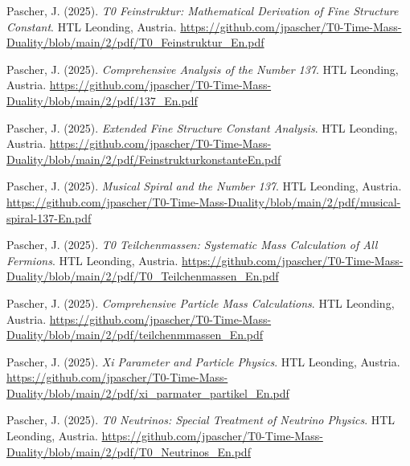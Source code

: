 \documentclass{article}
\begin{document}
\begin{thebibliography}{99}
		
		Pascher, J. (2025).
		\textit{T0 Feinstruktur: Mathematical Derivation of Fine Structure Constant}.
		HTL Leonding, Austria.
		\url{https://github.com/jpascher/T0-Time-Mass-Duality/blob/main/2/pdf/T0_Feinstruktur_En.pdf}
		
		Pascher, J. (2025).
		\textit{Comprehensive Analysis of the Number 137}.
		HTL Leonding, Austria.
		\url{https://github.com/jpascher/T0-Time-Mass-Duality/blob/main/2/pdf/137_En.pdf}
		
		Pascher, J. (2025).
		\textit{Extended Fine Structure Constant Analysis}.
		HTL Leonding, Austria.
		\url{https://github.com/jpascher/T0-Time-Mass-Duality/blob/main/2/pdf/FeinstrukturkonstanteEn.pdf}
		
		Pascher, J. (2025).
		\textit{Musical Spiral and the Number 137}.
		HTL Leonding, Austria.
		\url{https://github.com/jpascher/T0-Time-Mass-Duality/blob/main/2/pdf/musical-spiral-137-En.pdf}
		
		
		Pascher, J. (2025).
		\textit{T0 Teilchenmassen: Systematic Mass Calculation of All Fermions}.
		HTL Leonding, Austria.
		\url{https://github.com/jpascher/T0-Time-Mass-Duality/blob/main/2/pdf/T0_Teilchenmassen_En.pdf}
		
		Pascher, J. (2025).
		\textit{Comprehensive Particle Mass Calculations}.
		HTL Leonding, Austria.
		\url{https://github.com/jpascher/T0-Time-Mass-Duality/blob/main/2/pdf/teilchenmmassen_En.pdf}
		
		Pascher, J. (2025).
		\textit{Xi Parameter and Particle Physics}.
		HTL Leonding, Austria.
		\url{https://github.com/jpascher/T0-Time-Mass-Duality/blob/main/2/pdf/xi_parmater_partikel_En.pdf}
		
		
		Pascher, J. (2025).
		\textit{T0 Neutrinos: Special Treatment of Neutrino Physics}.
		HTL Leonding, Austria.
		\url{https://github.com/jpascher/T0-Time-Mass-Duality/blob/main/2/pdf/T0_Neutrinos_En.pdf}
		

\end{thebibliography}
\end{document}
